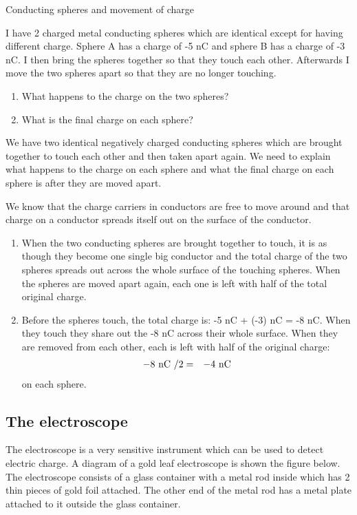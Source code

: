 \begin{wex}{Conducting spheres and movement of charge}
{I have 2 charged metal conducting spheres which are identical except for having different charge. Sphere A has a charge of -5 nC and sphere B has a charge of -3 nC. I then bring the spheres together so that they touch each other. Afterwards I move the two spheres apart so that they are no longer touching.
\begin{enumerate}
\item What happens to the charge on the two spheres?
\item What is the final charge on each sphere?
\end{enumerate}
}
{
We have two identical negatively charged conducting spheres which are brought together to touch each other and then taken apart again. We need to explain what happens to the charge on each sphere and what the final charge on each sphere is after they are moved apart.

We know that the charge carriers in conductors are free to move around and that charge on a conductor spreads itself out on the surface of the conductor.

\begin{enumerate}
\item When the two conducting spheres are brought together to touch, it is as though they become one single big conductor and the total charge of the two spheres spreads out across the whole surface of the touching spheres. When the spheres are moved apart again, each one is left with half of the total original charge.
\item Before the spheres touch, the total charge is: -5 nC + (-3) nC = -8 nC. When they touch they share out the -8 nC across their whole surface. When they are removed from each other, each is left with half of the original charge:
\begin{eqnarray*}
-8\ \rm{nC} \ / 2 &=& -4 \ \rm{nC}
\end{eqnarray*}
on each sphere.

\end{enumerate}
}
\end{wex}

\subsection{The electroscope}
The electroscope is a very sensitive instrument which can be used to detect electric charge.
A diagram of a gold leaf electroscope is shown the figure below. The electroscope consists of a glass container
with a metal rod inside which has 2 thin pieces of gold foil attached. The other end of the metal rod has a metal plate attached to it outside the glass container.

